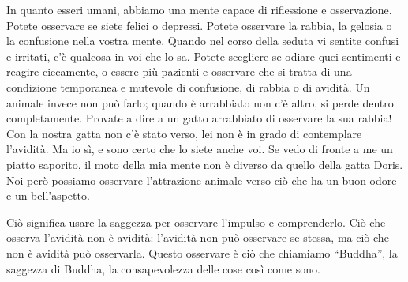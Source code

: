 In quanto esseri umani, abbiamo una mente capace di riflessione e
osservazione. Potete osservare se siete felici o depressi. Potete
osservare la rabbia, la gelosia o la confusione nella vostra mente.
Quando nel corso della seduta vi sentite confusi e irritati, c'è
qualcosa in voi che lo sa. Potete scegliere se odiare quei sentimenti e
reagire ciecamente, o essere più pazienti e osservare che si tratta di
una condizione temporanea e mutevole di confusione, di rabbia o di
avidità. Un animale invece non può farlo; quando è arrabbiato non c'è
altro, si perde dentro completamente. Provate a dire a un gatto
arrabbiato di osservare la sua rabbia! Con la nostra gatta non c'è stato
verso, lei non è in grado di contemplare l'avidità. Ma io sì, e sono
certo che lo siete anche voi. Se vedo di fronte a me un piatto saporito,
il moto della mia mente non è diverso da quello della gatta Doris. Noi
però possiamo osservare l'attrazione animale verso ciò che ha un buon
odore e un bell'aspetto.

Ciò significa usare la saggezza per osservare l'impulso e comprenderlo.
Ciò che osserva l'avidità non è avidità: l'avidità non può osservare se
stessa, ma ciò che non è avidità può osservarla. Questo osservare è ciò
che chiamiamo ``Buddha'', la saggezza di Buddha, la consapevolezza delle
cose così come sono.

